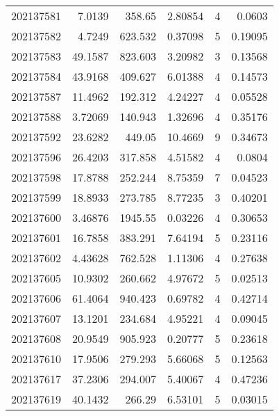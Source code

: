 \begin{tabular}{rrrrrr}
 202137581 &          7.0139  &      358.65   &            2.80854 &           4 & 0.0603  \\
 202137582 &          4.7249  &      623.532  &            0.37098 &           5 & 0.19095 \\
 202137583 &         49.1587  &      823.603  &            3.20982 &           3 & 0.13568 \\
 202137584 &         43.9168  &      409.627  &            6.01388 &           4 & 0.14573 \\
 202137587 &         11.4962  &      192.312  &            4.24227 &           4 & 0.05528 \\
 202137588 &          3.72069 &      140.943  &            1.32696 &           4 & 0.35176 \\
 202137592 &         23.6282  &      449.05   &           10.4669  &           9 & 0.34673 \\
 202137596 &         26.4203  &      317.858  &            4.51582 &           4 & 0.0804  \\
 202137598 &         17.8788  &      252.244  &            8.75359 &           7 & 0.04523 \\
 202137599 &         18.8933  &      273.785  &            8.77235 &           3 & 0.40201 \\
 202137600 &          3.46876 &     1945.55   &            0.03226 &           4 & 0.30653 \\
 202137601 &         16.7858  &      383.291  &            7.64194 &           5 & 0.23116 \\
 202137602 &          4.43628 &      762.528  &            1.11306 &           4 & 0.27638 \\
 202137605 &         10.9302  &      260.662  &            4.97672 &           5 & 0.02513 \\
 202137606 &         61.4064  &      940.423  &            0.69782 &           4 & 0.42714 \\
 202137607 &         13.1201  &      234.684  &            4.95221 &           4 & 0.09045 \\
 202137608 &         20.9549  &      905.923  &            0.20777 &           5 & 0.23618 \\
 202137610 &         17.9506  &      279.293  &            5.66068 &           5 & 0.12563 \\
 202137617 &         37.2306  &      294.007  &            5.40067 &           4 & 0.47236 \\
 202137619 &         40.1432  &      266.29   &            6.53101 &           5 & 0.03015 \\

\end{tabular}
